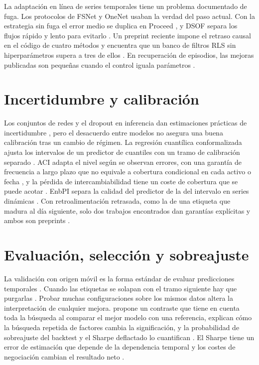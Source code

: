 \documentclass[11pt,a4paper]{report}
\begin{document}
La adaptación en línea de series temporales tiene un problema documentado de
fuga. Los protocolos de FSNet y OneNet \parencite{pham2023fsnet,zhang2023onenet}
usaban la verdad del paso actual. Con la estrategia sin fuga el error medio
se duplica en Proceed \parencite{zhao2025proceed}, y DSOF separa los flujos
rápido y lento para evitarlo \parencite{lau2025dsof}. Un preprint reciente
impone el retraso causal en el código de cuatro métodos y encuentra que un
banco de filtros RLS sin hiperparámetros supera a tres de ellos
\parencite{fentazi2026delayaudit}. En recuperación de episodios, las mejoras
publicadas son pequeñas cuando el control iguala parámetros
\parencite{lyu2026tsmemory,han2025raft}.

\section{Incertidumbre y calibración}
Los conjuntos de redes y el dropout en inferencia dan estimaciones prácticas de
incertidumbre \parencite{lakshminarayanan2017ensembles,gal2016dropout}, pero el
desacuerdo entre modelos no asegura una buena calibración tras un cambio de
régimen. La regresión cuantílica conformalizada ajusta los intervalos de un
predictor de cuantiles con un tramo de calibración separado
\parencite{romano2019cqr}. ACI adapta el nivel según se observan errores, con
una garantía de frecuencia a largo plazo que no equivale a cobertura
condicional en cada activo o fecha \parencite{gibbs2021aci}, y la pérdida de
intercambiabilidad tiene un coste de cobertura que se puede acotar
\parencite{barber2023exchangeability}. EnbPI separa la calidad del predictor
de la del intervalo en series dinámicas \parencite{xu2021enbpi}. Con
retroalimentación retrasada, como la de una etiqueta que madura al día
siguiente, solo dos trabajos encontrados dan garantías explícitas y ambos son
preprints \parencite{wang2024multistepcp,halabi2026delayedaci}.

\section{Evaluación, selección y sobreajuste}
La validación con origen móvil es la forma estándar de evaluar predicciones
temporales \parencite{hyndman2021fpp3}. Cuando las etiquetas se solapan con el
tramo siguiente hay que purgarlas \parencite{lopez2018afml}. Probar muchas
configuraciones sobre los mismos datos altera la interpretación de cualquier
mejora. \textcite{white2000realitycheck} propone un contraste que tiene en
cuenta toda la búsqueda al comparar el mejor modelo con una referencia, \textcite{harvey2016multiple}
explican cómo la búsqueda repetida de factores cambia la significación, y la
probabilidad de sobreajuste del backtest y el Sharpe deflactado lo cuantifican
\parencite{bailey2017pbo,bailey2014dsr}. El Sharpe tiene un error de
estimación que depende de la dependencia temporal \parencite{lo2002sharpe} y
los costes de negociación cambian el resultado neto \parencite{frazzini2018costs}.
\end{document}
